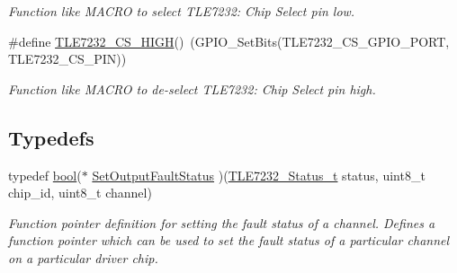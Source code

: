 \begin{DoxyCompactItemize}
\begin{DoxyCompactList}\small\item\em Function like M\-A\-C\-R\-O to select T\-L\-E7232\-: Chip Select pin low. \end{DoxyCompactList}\item 
\hypertarget{group__tle7232__driver_ga3a719332ae22bc9078a2b10a07c4e4f0}{\#define \hyperlink{group__tle7232__driver_ga3a719332ae22bc9078a2b10a07c4e4f0}{T\-L\-E7232\-\_\-\-C\-S\-\_\-\-H\-I\-G\-H}()~(G\-P\-I\-O\-\_\-\-Set\-Bits(T\-L\-E7232\-\_\-\-C\-S\-\_\-\-G\-P\-I\-O\-\_\-\-P\-O\-R\-T, T\-L\-E7232\-\_\-\-C\-S\-\_\-\-P\-I\-N))}\label{group__tle7232__driver_ga3a719332ae22bc9078a2b10a07c4e4f0}

\begin{DoxyCompactList}\small\item\em Function like M\-A\-C\-R\-O to de-\/select T\-L\-E7232\-: Chip Select pin high. \end{DoxyCompactList}\end{DoxyCompactItemize}
\subsection*{Typedefs}
\begin{DoxyCompactItemize}
\item 
\hypertarget{group__tle7232__driver_gaa9b9a934fcc689bc16f7dbf4ba70feb1}{typedef \hyperlink{group__data__types_ga0ecf26b576b9a54eca656b9be7ba6a06}{bool}($\ast$ \hyperlink{group__tle7232__driver_gaa9b9a934fcc689bc16f7dbf4ba70feb1}{Set\-Output\-Fault\-Status} )(\hyperlink{group__tle7232__driver_ga84bb3f68b575c6add1c27f053b87746a}{T\-L\-E7232\-\_\-\-Status\-\_\-t} status, uint8\-\_\-t chip\-\_\-id, uint8\-\_\-t channel)}\label{group__tle7232__driver_gaa9b9a934fcc689bc16f7dbf4ba70feb1}

\begin{DoxyCompactList}\small\item\em Function pointer definition for setting the fault status of a channel. Defines a function pointer which can be used to set the fault status of a particular channel on a particular driver chip. \end{DoxyCompactList}\end{DoxyCompactItemize}
